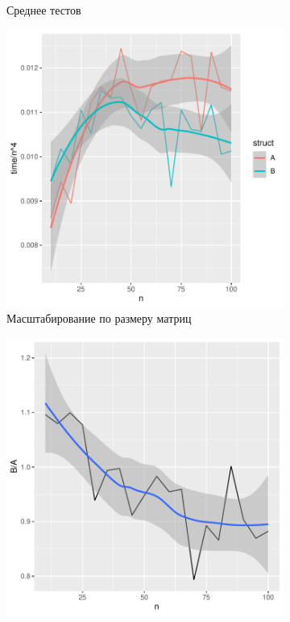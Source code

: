 \documentclass[specialist,
substylefile = spbu.rtx,
               subf,href,colorlinks=true, 12pt]{disser}
\begin{document}
\begin{figure}[h]
\begin{minipage}[t]{\columnwidth}
\begin{subfigure}[t]{0.475\linewidth}
            \caption{Среднее тестов}
        \end{subfigure}
        \end{minipage}%
        \hfill
        \begin{minipage}[t]{\columnwidth}%
        \begin{subfigure}[t]{0.475\linewidth}%
            \includegraphics[width=\linewidth]{line_smooth_norm.pdf}
            \caption{Масштабирование по размеру матриц}
        \end{subfigure}%
        \hfill
        \begin{subfigure}[t]{0.475\linewidth}%
            \includegraphics[width=\linewidth]{relation.pdf} 

\end{subfigure}
\end{minipage}
\end{figure}
\end{document}
